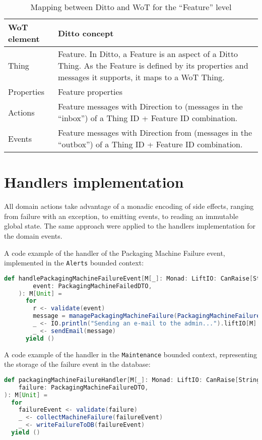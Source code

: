 \begin{table}[H]
    \begin{tabular}{|p{}|p{}|}
    \hline
    \textbf{WoT element} & \textbf{Ditto concept} \\ \hline
    Thing & Feature. In Ditto, a Feature is an aspect of a Ditto Thing. As the Feature is defined by its properties and messages it supports, it maps to a WoT Thing. \\ \hline
    Properties & Feature properties \\ \hline
    Actions &	Feature messages with Direction to (messages in the “inbox”) of a Thing ID + Feature ID combination. \\ \hline
    Events &	Feature messages with Direction from (messages in the “outbox”) of a Thing ID + Feature ID combination. \\ \hline
    \end{tabular}
    \caption{Mapping between Ditto and WoT for the ``Feature'' level}
    \label{tab:ditto-wot-feature}
\end{table}

\section{Handlers implementation}
All domain actions take advantage of a monadic encoding of side effects, ranging from failure with an exception, to emitting events, to reading an immutable global state.
The same approach were applied to the handlers implementation for the domain events.


A code example of the handler of the Packaging Machine Failure event, implemented in the \texttt{Alerts} bounded context:

\begin{lstlisting}[language=Scala]
    def handlePackagingMachineFailureEvent[M[_]: Monad: LiftIO: CanRaise[String]](
        event: PackagingMachineFailedDTO,
    ): M[Unit] =
      for
        r <- validate(event)
        message = managePackagingMachineFailure(PackagingMachineFailure(LocalTime.now(), r.batchID, r.cutterTemperature))
        _ <- IO.println("Sending an e-mail to the admin...").liftIO[M]
        _ <- sendEmail(message)
      yield ()
\end{lstlisting}


A code example of the handler in the \texttt{Maintenance} bounded context, representing the storage of the failure event in the database:

\begin{lstlisting}[language=Scala]
def packagingMachineFailureHandler[M[_]: Monad: LiftIO: CanRaise[String]](
    failure: PackagingMachineFailureDTO,
): M[Unit] =
  for
    failureEvent <- validate(failure)
    _ <- collectMachineFailure(failureEvent)
    _ <- writeFailureToDB(failureEvent)
  yield ()
\end{lstlisting}